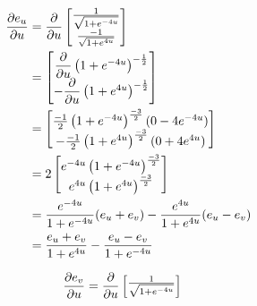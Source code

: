 \documentclass[a4paper, 11pt]{article}
\begin{document}
\begin{enumerate}[label=(\alph*)]
        \begin{mdframed}
          \begin{minipage}[t]{0.5\textwidth}
            \begin{align*}
              \dfrac{\partial e_u}{\partial u} & = \dfrac{\partial}{\partial u}\begin{bmatrix}
                                    \frac{1}{\sqrt{1 + e^{-4u}}} \\
                                    \frac{-1}{\sqrt{1 + e^{4u}}}
                                  \end{bmatrix}                       \\
                        & = \begin{bmatrix}
                              \dfrac{\partial}{\partial u}\left( 1 + e^{-4u} \right)^{-\frac 12} \\
                              -\dfrac{\partial}{\partial u}\left(1 + e^{4u} \right)^{-\frac 12}
                            \end{bmatrix}                 \\
                        & =  \begin{bmatrix}
                               \frac{-1}2\left( 1+e^{-4u} \right)^{\frac{-3}2}(0-4e^{-4u}) \\
                               -\frac{-1}2\left( 1+e^{4u} \right)^{\frac{-3}2}(0+4e^{4u})
                             \end{bmatrix} \\
                        & =  2\begin{bmatrix}
                                e^{-4u}\left( 1+e^{-4u} \right)^{\frac{-3}2} \\
                                e^{4u}\left( 1+e^{4u} \right)^{\frac{-3}2}
                              \end{bmatrix}               \\
                        & =
              \frac{e^{-4u}}{
              1+e^{-4u}
              }(e_u+e_v)
              -\frac{e^{4u}}{1+e^{4u}}(e_u-e_v)                                          \\
                        & = \frac{e_u+e_v}{1+e^{4u}}-\frac{e_u-e_v}{1+e^{-4u}}
            \end{align*}
          \end{minipage}\begin{minipage}[t]{0.5\textwidth}
            \begin{align*}
              \dfrac{\partial e_v}{\partial u} & = \dfrac{\partial}{\partial u}\begin{bmatrix}
                                    \frac{1}{\sqrt{1 + e^{-4u}}} \\

\end{bmatrix}
\end{align*}
\end{minipage}
\end{mdframed}
\end{enumerate}
\end{document}
